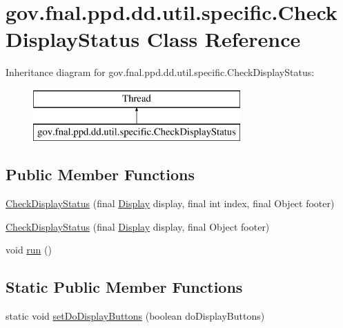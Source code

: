 \hypertarget{classgov_1_1fnal_1_1ppd_1_1dd_1_1util_1_1specific_1_1CheckDisplayStatus}{\section{gov.\-fnal.\-ppd.\-dd.\-util.\-specific.\-Check\-Display\-Status Class Reference}
\label{classgov_1_1fnal_1_1ppd_1_1dd_1_1util_1_1specific_1_1CheckDisplayStatus}
}
Inheritance diagram for gov.\-fnal.\-ppd.\-dd.\-util.\-specific.\-Check\-Display\-Status\-:\begin{figure}[H]
\begin{center}
\leavevmode
\includegraphics[height=2.000000cm]{classgov_1_1fnal_1_1ppd_1_1dd_1_1util_1_1specific_1_1CheckDisplayStatus}
\end{center}
\end{figure}
\subsection*{Public Member Functions}
\begin{DoxyCompactItemize}
\item 
\hyperlink{classgov_1_1fnal_1_1ppd_1_1dd_1_1util_1_1specific_1_1CheckDisplayStatus_a9b515eaa64b3c2f3527205876f262038}{Check\-Display\-Status} (final \hyperlink{interfacegov_1_1fnal_1_1ppd_1_1dd_1_1signage_1_1Display}{Display} display, final int index, final Object footer)
\item 
\hyperlink{classgov_1_1fnal_1_1ppd_1_1dd_1_1util_1_1specific_1_1CheckDisplayStatus_a71115f44f6b32092706ef07668d736b8}{Check\-Display\-Status} (final \hyperlink{interfacegov_1_1fnal_1_1ppd_1_1dd_1_1signage_1_1Display}{Display} display, final Object footer)
\item 
void \hyperlink{classgov_1_1fnal_1_1ppd_1_1dd_1_1util_1_1specific_1_1CheckDisplayStatus_a763fb783cd33bd5160c3efcaad92a37b}{run} ()
\end{DoxyCompactItemize}
\subsection*{Static Public Member Functions}
\begin{DoxyCompactItemize}
\item 
static void \hyperlink{classgov_1_1fnal_1_1ppd_1_1dd_1_1util_1_1specific_1_1CheckDisplayStatus_adb4d88f5eb9f4ef97a1442e58f6f9a62}{set\-Do\-Display\-Buttons} (boolean do\-Display\-Buttons)
\end{DoxyCompactItemize}



